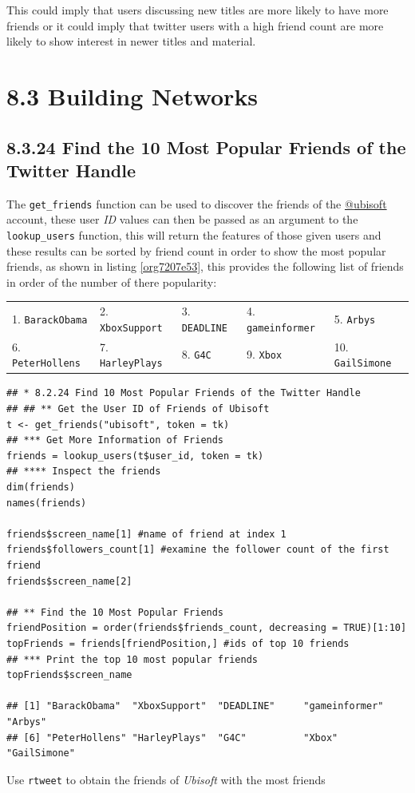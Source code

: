 \documentclass[11pt]{article}
\begin{document}
This could imply that users discussing new titles are more likely to have more friends or it could imply that twitter users with a high friend count are more likely to show interest in newer titles and material.
\section{8.3 Building Networks}
\label{sec:org27d8915}
\subsection{8.3.24 Find the 10 Most Popular Friends of the Twitter Handle}
\label{sec:org8b65b6c}
The \texttt{get\_friends} function can be used to discover the friends of the \href{https://twitter.com/Ubisoft}{@ubisoft}
account, these user \emph{ID} values can then be passed as an argument to the
\texttt{lookup\_users} function, this will return the features of those given users and
these results can be sorted by friend count in order to show the most popular
friends, as shown in listing \ref{org7207e53}, this provides the following list of friends in
order of the number of there popularity:

\begin{center}
\begin{tabular}{lllll}
1. \texttt{BarackObama} & 2.  \texttt{XboxSupport} & 3. \texttt{DEADLINE} & 4.  \texttt{gameinformer} & 5.  \texttt{Arbys}\\
6.  \texttt{PeterHollens} & 7.  \texttt{HarleyPlays} & 8. \texttt{G4C} & 9.  \texttt{Xbox} & 10. \texttt{GailSimone}\\
\end{tabular}
\end{center}


\begin{listing}[htbp]
\begin{verbatim}
## * 8.2.24 Find 10 Most Popular Friends of the Twitter Handle
## ## ** Get the User ID of Friends of Ubisoft
t <- get_friends("ubisoft", token = tk)
## *** Get More Information of Friends
friends = lookup_users(t$user_id, token = tk)
## **** Inspect the friends
dim(friends)
names(friends)

friends$screen_name[1] #name of friend at index 1
friends$followers_count[1] #examine the follower count of the first friend
friends$screen_name[2]

## ** Find the 10 Most Popular Friends
friendPosition = order(friends$friends_count, decreasing = TRUE)[1:10]
topFriends = friends[friendPosition,] #ids of top 10 friends
## *** Print the top 10 most popular friends
topFriends$screen_name

## [1] "BarackObama"  "XboxSupport"  "DEADLINE"     "gameinformer" "Arbys"
## [6] "PeterHollens" "HarleyPlays"  "G4C"          "Xbox"         "GailSimone"
\end{verbatim}
\caption{\label{org7207e53}Use \texttt{rtweet} to obtain the friends of \emph{Ubisoft} with the most friends}
\end{listing}
\end{document}
